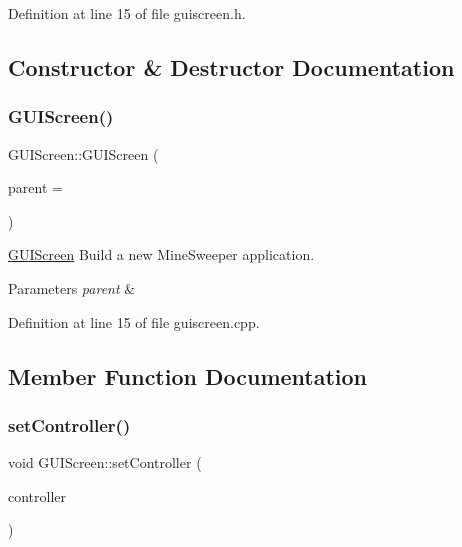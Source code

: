 Definition at line 15 of file guiscreen.\+h.



\subsection{Constructor \& Destructor Documentation}
\mbox{\label{class_g_u_i_screen_aade2245bd739d9cd5cb667751c20dc05}} 
\subsubsection{\texorpdfstring{G\+U\+I\+Screen()}{GUIScreen()}}
{\footnotesize\ttfamily G\+U\+I\+Screen\+::\+G\+U\+I\+Screen (\begin{DoxyParamCaption}\item[{Q\+Widget $\ast$}]{parent = {} }\end{DoxyParamCaption})\hspace{0.3cm}{\ttfamily [explicit]}}



\hyperlink{class_g_u_i_screen}{G\+U\+I\+Screen} Build a new Mine\+Sweeper application. 


\begin{DoxyParams}{Parameters}
{\em parent} & \\
\hline
\end{DoxyParams}


Definition at line 15 of file guiscreen.\+cpp.



\subsection{Member Function Documentation}
\mbox{\label{class_g_u_i_screen_a02f2d6be64e2734c5a2cad7dc30689c1}} 
\subsubsection{\texorpdfstring{set\+Controller()}{setController()}}
{\footnotesize\ttfamily void G\+U\+I\+Screen\+::set\+Controller (\begin{DoxyParamCaption}\item[{\hyperlink{class_controller}{Controller} $\ast$}]{controller }\end{DoxyParamCaption})}



